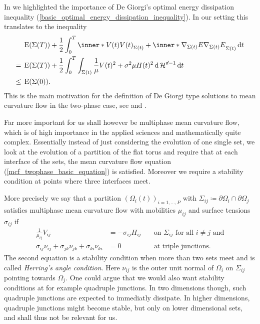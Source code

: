 In  we highlighted the importance of
De Giorgi's optimal energy dissipation inequality (\ref{basic_optimal_energy_dissipation_inequality}). In our setting  this translates to the inequality
\begin{align*}
	& \energy ( \Sigma ( T ) )
	+
	\frac{ 1 }{ 2 }
	\int_{ 0 }^{ T }
		\inner*{ V ( t ) }{ V ( t ) }_{ \Sigma ( t ) }
		+
		\inner*{ \nabla_{ \Sigma ( t ) } E }{ \nabla_{ \Sigma ( t ) } E }_{ 
		\Sigma ( t ) }
	\dd{ t }
	\\
	={}
	&\energy ( \Sigma ( T ) )
	+
	\frac{ 1 }{ 2 }
	\int_{ 0 }^{ T }
		\int_{ \Sigma (t ) }
			\frac{ 1 }{ \mu }
			V( t )^{ 2 } 
			+
			\sigma^{ 2 } \mu 
			H( t ) ^{ 2 }
		\dd{ \hm^{ d - 1 } }
	\dd{ t }
	\\
	\leq{} &
	\energy ( \Sigma ( 0 ) ).
\end{align*}
This is the main motivation for the definition of De Giorgi type solutions to 
mean curvature flow in the two-phase case, see 
 and 
.

Far more important for us shall however be multiphase mean curvature flow, 
which is of high importance in the applied sciences and mathematically quite 
complex. 
Essentially instead of just considering the evolution of one single set, we 
look at the evolution of a partition of the flat torus and require that at each 
interface of the sets, the mean curvature flow equation 
(\ref{mcf_twophase_basic_equation}) is satisfied. Moreover we require a 
stability condition at points where three interfaces meet.

More precisely we say that a partition $ ( \Omega_{ i } ( t ) )_{ i = 1 , 
\dotsc , P } $ with 
$ \Sigma_{ i j } \coloneqq \partial \Omega_{ i } \cap \partial \Omega_{ j } $ 
satisfies multiphase mean curvature flow with mobilities $ \mu_{ i j } $ and 
surface 
tensions $ \sigma_{ i j } $ if 
\begin{align}
		\label{v_is_equal_to_h}
		\frac{ 1 }{ \mu_{ i j } }
		V_{ i j }
		& =
		-
		\sigma_{ i  j }
		H_{ i j }
		\quad
		&\text{on } \Sigma_{i j }\text{ for all }i\neq j \text{ and}
		\\
		\label{herrings_angle_condition}
			\sigma_{ i j }
			\nu_{ i j }
			+
			\sigma_{ j k }
			\nu_{ j k }
			+
			\sigma_{ k i }
			\nu_{ k i }
		& =
		0
		& \text{at triple junctions}.
\end{align}
The second equation is a stability condition when more than two sets meet and is
called \emph{Herring's angle condition}. Here $ \nu_{ i j } $ is the outer unit 
normal of $ \Omega_{ i } $
on $ \Sigma_{ i j } $ pointing towards $ \Omega_{ j } $. 
One could argue that we would also want stability conditions at for example 
quadruple 
junctions. In two dimensions though, such quadruple junctions are expected to 
immediatly dissipate. In higher dimensions, quadruple junctions might become 
stable, but only on lower dimensional sets, and shall thus not be relevant for 
us.

